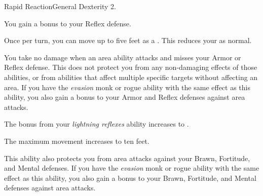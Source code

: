   \begin{feat}{Rapid Reaction}{General}
    \featpre Dexterity 2.

     You gain a  bonus to your Reflex defense.

     Once per turn, you can move up to five feet as a .
    This reduces your  as normal.

     You take no damage when an area ability attacks and misses your Armor or Reflex defense.
    This does not protect you from any non-damaging effects of those abilities, or from abilities that affect multiple specific targets without affecting an area.
    If you have the \textit{evasion} monk or rogue ability with the same effect as this ability, you also gain a  bonus to your Armor and Reflex defenses against area attacks.

     The bonus from your \textit{lightning reflexes} ability increases to .

     The maximum movement increases to ten feet.

     This ability also protects you from area attacks against your Brawn, Fortitude, and Mental defenses.
    If you have the \textit{evasion\plus} monk or rogue ability with the same effect as this ability, you also gain a  bonus to your Brawn, Fortitude, and Mental defenses against area attacks.
  \end{feat}

